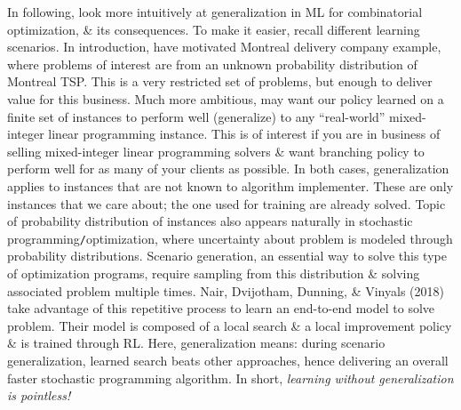 \documentclass{article}
\begin{document}
\begin{itemize}
\begin{itemize}
        In following, look more intuitively at generalization in ML for combinatorial optimization, \& its consequences. To make it easier, recall different learning scenarios. In introduction, have motivated Montreal delivery company example, where problems of interest are from an unknown probability distribution of Montreal TSP. This is a very restricted set of problems, but enough to deliver value for this business. Much more ambitious, may want our policy learned on a finite set of instances to perform well (generalize) to any ``real-world'' mixed-integer linear programming instance. This is of interest if you are in business of selling mixed-integer linear programming solvers \& want branching policy to perform well for as many of your clients as possible. In both cases, generalization applies to instances that are not known to algorithm implementer. These are only instances that we care about; the one used for training are already solved. Topic of probability distribution of instances also appears naturally in stochastic programming{\tt/}optimization, where uncertainty about problem is modeled through probability distributions. Scenario generation, an essential way to solve this type of optimization programs, require sampling from this distribution \& solving associated problem multiple times. Nair, Dvijotham, Dunning, \& Vinyals (2018) take advantage of this repetitive process to learn an end-to-end model to solve problem. Their model is composed of a local search \& a local improvement policy \& is trained through RL. Here, generalization means: during scenario generalization, learned search beats other approaches, hence delivering an overall faster stochastic programming algorithm. In short, {\it learning without generalization is pointless!}


\end{itemize}
\end{itemize}
\end{document}
